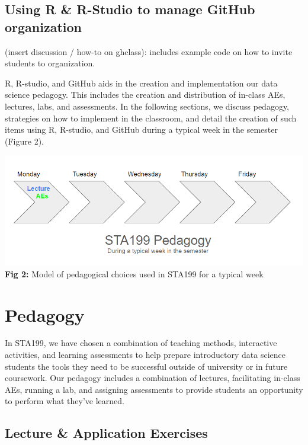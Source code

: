 \documentclass[
  12pt]{article}
\begin{document}
\hypertarget{using-r-r-studio-to-manage-github-organization}{%
\subsection{Using R \& R-Studio to manage GitHub
organization}\label{using-r-r-studio-to-manage-github-organization}}

(insert discussion / how-to on ghclass): includes example code on how to
invite students to organization.

R, R-studio, and GitHub aids in the creation and implementation our data
science pedagogy. This includes the creation and distribution of
in-class AEs, lectures, labs, and assessments. In the following
sections, we discuss pedagogy, strategies on how to implement in the
classroom, and detail the creation of such items using R, R-studio, and
GitHub during a typical week in the semester (Figure 2).

\includegraphics{images/pedagogy.png} \textbf{Fig 2:} Model of
pedagogical choices used in STA199 for a typical week

\hypertarget{sec-ped}{%
\section{Pedagogy}\label{sec-ped}}

In STA199, we have chosen a combination of teaching methods, interactive
activities, and learning assessments to help prepare introductory data
science students the tools they need to be successful outside of
university or in future coursework. Our pedagogy includes a combination
of lectures, facilitating in-class AEs, running a lab, and assigning
assessments to provide students an opportunity to perform what they've
learned.

\hypertarget{lecture-application-exercises}{%
\subsection{Lecture \& Application
Exercises}\label{lecture-application-exercises}}
\end{document}
